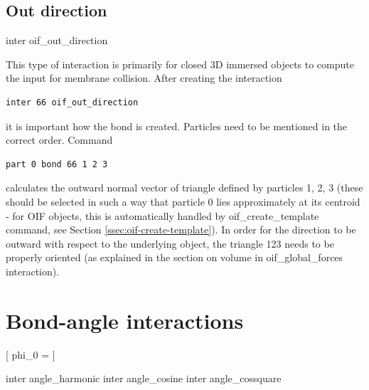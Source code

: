 \subsection{Out direction}

\begin{essyntax}
  inter 
  oif\_out\_direction
    \begin{features}
  \end{features}
\end{essyntax}
This type of interaction is primarily for closed 3D immersed objects to compute the 
input for membrane collision. After creating the interaction
\begin{verbatim} 
inter 66 oif_out_direction
\end{verbatim}
it is important how the bond is created. Particles need to be mentioned in the 
correct order. Command
\begin{verbatim} 
part 0 bond 66 1 2 3
\end{verbatim}
calculates the outward normal vector of triangle defined by particles 1, 2, 3 
(these should be selected in such a way that particle 0 lies approximately at 
its centroid - for OIF objects, this is automatically handled by oif\_create\_template 
command, see Section \ref{ssec:oif-create-template}). In order for the direction to be outward with respect to the 
underlying object, the triangle 123 needs to be properly oriented (as 
explained in the section on volume in oif\_global\_forces interaction). 


\section{Bond-angle interactions}
\label{sec:angle}

\begin{pysyntax}
  [
    phi_0 = 
  ]
\end{pysyntax}

\begin{essyntax}
   inter  angle\_harmonic  
   inter  angle\_cosine  
   inter  angle\_cossquare  
  \begin{features}
  \end{features}
\end{essyntax}

